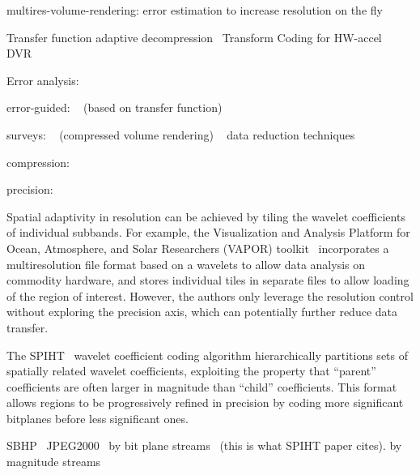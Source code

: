multires-volume-rendering: error estimation to increase resolution on the fly

Transfer function adaptive decompression~\cite{tf_decompression2004}
Transform Coding for HW-accel DVR~\cite{hw_dvr2007}

Error analysis:
~\cite{evaluating-compression-climate}
~\cite{compression_sim2013}
~\cite{statistical-volume-quality}
~\cite{evaluating-efficacy-wavelet}
~\cite{topology-verification-isosurface}
~\cite{verifiable-isosurface}
~\cite{verifying-volume-rendering}
~\cite{statistical-volume-quality}

error-guided: 
~\cite{tf_decompression2004} (based on transfer function)

surveys:
~\cite{state-of-the-art-compressed-volume} (compressed volume rendering)
~\cite{li2018} data reduction techniques

compression:
~\cite{isabela}
~\cite{fpzip}
~\cite{sz}
~\cite{zfp2014}

precision:
~\cite{ezw}
~\cite{spiht1996}
~\cite{mloc}
~\cite{sbhp2000}
~\cite{jpeg2001}

Spatial adaptivity in resolution can be achieved by tiling the wavelet coefficients of individual
subbands. For example, the Visualization and Analysis Platform for Ocean, Atmosphere, and Solar
Researchers (VAPOR) toolkit~\cite{multires_toolkit2003, vapor2007} incorporates a multiresolution
file format based on a wavelets to allow data analysis on commodity hardware, and stores individual
tiles in separate files to allow loading of the region of interest. However, the authors only
leverage the resolution control without exploring the precision axis, which can potentially further
reduce data transfer.

The SPIHT~\cite{spiht1996} wavelet coefficient coding algorithm hierarchically partitions sets of
spatially related wavelet coefficients, exploiting the property that ``parent'' coefficients are
often larger in magnitude than ``child'' coefficients. This format allows regions to be
progressively refined in precision by coding more significant bitplanes before less significant
ones.

SBHP~\cite{sbhp2000}
JPEG2000~\cite{jpeg2001}
by bit plane streams~\cite{compression_techniques1991} (this is what SPIHT paper cites).
by magnitude streams~\cite{image_compression1992}

